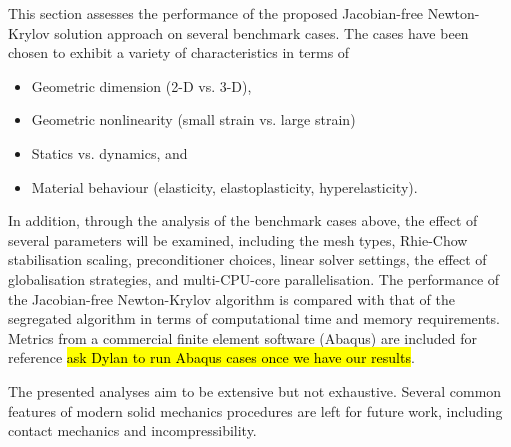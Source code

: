 \documentclass[sn-mathphys,Numbered,draft]{sn-jnl}%
\begin{document}
%	

This section assesses the performance of the proposed Jacobian-free Newton-Krylov solution approach on several benchmark cases.
The cases have been chosen to exhibit a variety of characteristics in terms of
\begin{itemize}
	\item Geometric dimension (2-D vs. 3-D),
	\item Geometric nonlinearity (small strain vs. large strain)
	\item Statics vs. dynamics, and
	\item Material behaviour (elasticity, elastoplasticity, hyperelasticity).
\end{itemize}

In addition, through the analysis of the benchmark cases above, the effect of several parameters will be examined, including the mesh types, Rhie-Chow stabilisation scaling, preconditioner choices, linear solver settings, the effect of globalisation strategies, and multi-CPU-core parallelisation.
The performance of the Jacobian-free Newton-Krylov algorithm is compared with that of the segregated algorithm in terms of computational time and memory requirements.
Metrics from a commercial finite element software (Abaqus) are included for reference \hl{ask Dylan to run Abaqus cases once we have our results}.

The presented analyses aim to be extensive but not exhaustive.
Several common features of modern solid mechanics procedures are left for future work, including contact mechanics and incompressibility. %
\end{document}
